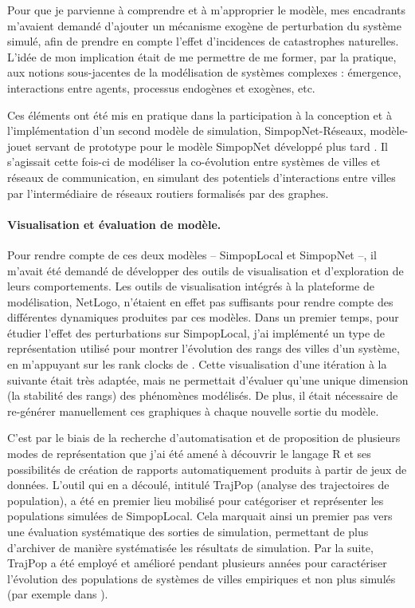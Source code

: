 Pour que je parvienne à comprendre et à m'approprier le modèle, mes encadrants m'avaient demandé d'ajouter un mécanisme exogène de perturbation du système simulé, afin de prendre en compte l'effet d'incidences de catastrophes naturelles. 
L'idée de mon implication était de me permettre de me former, par la pratique, aux notions sous-jacentes de la modélisation de systèmes complexes : émergence, interactions entre agents, processus endogènes et exogènes, etc.

Ces éléments ont été mis en pratique dans la participation à la conception et à l'implémentation d'un second modèle de simulation, \og SimpopNet-Réseaux\fg{}, \og modèle-jouet\fg{} servant de prototype pour le modèle SimpopNet développé plus tard \autocite{schmitt_modelisation_2014}.
Il s'agissait cette fois-ci de modéliser la co-évolution entre systèmes de villes et réseaux de communication, en simulant des potentiels d'interactions entre villes par l'intermédiaire de réseaux routiers formalisés par des graphes.

\paragraph{Visualisation et évaluation de modèle.}

Pour rendre compte de ces deux modèles -- SimpopLocal et SimpopNet --, il m'avait été demandé de développer des outils de visualisation et d'exploration de leurs comportements.
Les outils de visualisation intégrés à la plateforme de modélisation, NetLogo, n'étaient en effet pas suffisants pour rendre compte des différentes dynamiques produites par ces modèles.
Dans un premier temps, pour étudier l'effet des perturbations sur SimpopLocal, j'ai implémenté un type de représentation utilisé pour montrer l'évolution des rangs des villes d'un système, en m'appuyant sur les \og rank clocks\fg{} de \textcite{batty_rank_2006}.
Cette visualisation d'une itération à la suivante était très adaptée, mais ne permettait d'évaluer qu'une unique dimension (la stabilité des rangs) des phénomènes modélisés.
De plus, il était nécessaire de re-générer manuellement ces graphiques à chaque nouvelle sortie du modèle.

C'est par le biais de la recherche d'automatisation et de proposition de plusieurs modes de représentation que j'ai été amené à découvrir le langage R et ses possibilités de création de rapports automatiquement produits à partir de jeux de données.
L'outil qui en a découlé, intitulé TrajPop (analyse des trajectoires de population), a été en premier lieu mobilisé pour catégoriser et représenter les populations simulées de SimpopLocal.
Cela marquait ainsi un premier pas vers une évaluation systématique des sorties de simulation, permettant de plus d'archiver de manière systématisée les résultats de simulation.
Par la suite, TrajPop a été employé et amélioré pendant plusieurs années pour caractériser l'évolution des populations de systèmes de villes empiriques et non plus simulés (par exemple dans \textcite{pumain_multilevel_2015}).


